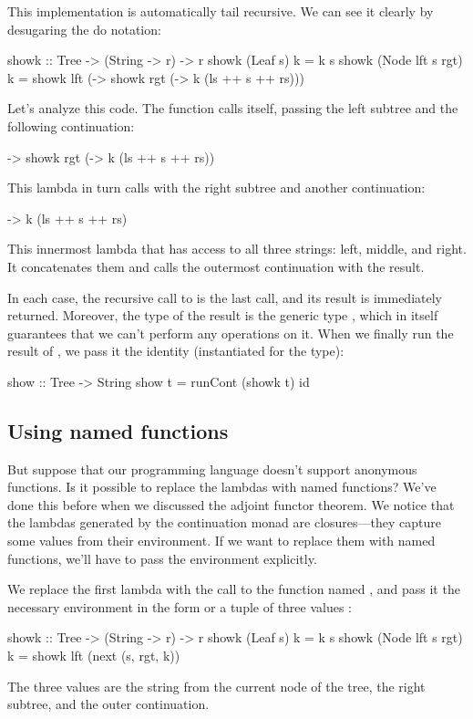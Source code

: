 \documentclass[DaoFP]{subfiles}
\begin{document}
This implementation is automatically tail recursive. We can see it clearly by desugaring the do notation:
\begin{haskell}
showk :: Tree -> (String -> r) -> r
showk (Leaf s) k = k s
showk (Node lft s rgt) k =
  showk lft (\ls -> 
    showk rgt (\rs -> 
      k (ls ++ s ++ rs)))
\end{haskell}
Let's analyze this code. The function calls itself, passing the left subtree  and the following continuation:
\begin{haskell}
\ls -> 
    showk rgt (\rs -> 
      k (ls ++ s ++ rs))
\end{haskell}
This lambda in turn calls  with the right subtree  and another continuation:
\begin{haskell}
\rs -> k (ls ++ s ++ rs)
\end{haskell}
This innermost lambda that has access to all three strings: left, middle, and right. It concatenates them and calls the outermost continuation  with the result.

In each case, the recursive call to  is the last call, and its result is immediately returned. Moreover, the type of the result is the generic type , which in itself guarantees that we can't perform any operations on it. When we finally run the result of , we pass it the identity (instantiated for the  type):
\begin{haskell}
show :: Tree -> String
show t = runCont (showk t) id
\end{haskell}

\subsection{Using named functions}

But suppose that our programming language doesn't support anonymous functions. Is it possible to replace the lambdas with named functions? We've done this before when we discussed the adjoint functor theorem. We notice that the lambdas generated by the continuation monad are closures---they capture some values from their environment. If we want to replace them with named functions, we'll have to pass the environment explicitly. 

We replace the first lambda with the call to the function named , and pass it the necessary environment in the form or a tuple of three values :
\begin{haskell}
showk :: Tree -> (String -> r) -> r
showk (Leaf s) k = k s
showk (Node lft s rgt) k =
  showk lft (next (s, rgt, k))
\end{haskell}
The three values are the string from the current node of the tree, the right subtree, and the outer continuation. 
\end{document}
